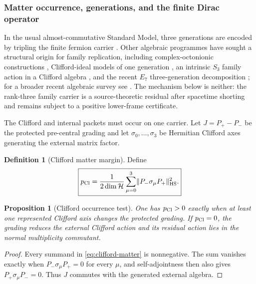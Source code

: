 \documentclass[11pt]{article}
\newtheorem{proposition}[theorem]{Proposition}
\theoremstyle{definition}
\newtheorem{definition}[theorem]{Definition}
\theoremstyle{remark}
\newcommand{\HS}{\mathrm{HS}}
\newcommand{\norm}[1]{\lVert#1\rVert}
\newcommand{\Hh}{\mathcal H}
\begin{document}
\subsubsection{Matter occurrence, generations, and the finite Dirac operator}

In the usual almost-commutative Standard Model, three generations are encoded
by tripling the finite fermion carrier
\cite{vanDenDungenVanSuijlekom2012,vanSuijlekom2025}.  Other algebraic
programmes have sought a structural origin for family replication, including
complex-octonionic constructions \cite{Furey2018}, Clifford-ideal models of
one generation \cite{Gresnigt2020}, an intrinsic $S_3$ family action in a
Clifford algebra \cite{Gresnigt2026}, and the recent $E_7$ three-generation
decomposition \cite{Baez2026}; for a broader recent algebraic survey see
\cite{FureyRoadmap2025}.  The mechanism below is
neither: the rank-three family carrier is a source-theoretic residual after
spacetime shorting and remains subject to a positive lower-frame certificate.

The Clifford and internal packets must occur on one carrier.  Let
$J=P_+-P_-$ be the protected pre-central grading and let
$\sigma_0,\ldots,\sigma_3$ be Hermitian Clifford axes generating the external
matrix factor.

\begin{definition}[Clifford matter margin]
\label{def:clifford-matter}
Define
\begin{equation}
\boxed{
p_{\rm Cl}
=
\frac{1}{2\dim\Hh}
\sum_{\mu=0}^{3}
\norm{P_-\sigma_\mu P_+}_{\HS}^2.}
\label{eq:clifford-matter}
\end{equation}
\end{definition}

\begin{proposition}[Clifford occurrence test]
\label{prop:clifford-occurrence}
One has $p_{\rm Cl}>0$ exactly when at least one represented Clifford axis
changes the protected grading.  If $p_{\rm Cl}=0$, the grading reduces the
external Clifford action and its residual action lies in the normal
multiplicity commutant.
\end{proposition}

\begin{proof}
Every summand in \eqref{eq:clifford-matter} is nonnegative.  The sum vanishes
exactly when $P_-\sigma_\mu P_+=0$ for every $\mu$, and self-adjointness then
also gives $P_+\sigma_\mu P_-=0$.  Thus $J$ commutes with the generated
external algebra.
\end{proof}
\end{document}

